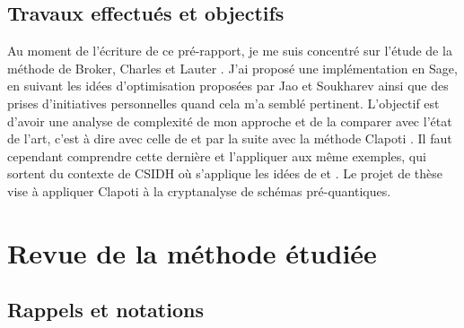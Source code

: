 \documentclass{article}
\theoremstyle{definition}
\theoremstyle{remark}
\begin{document}
	\subsection{Travaux effectués et objectifs}
	
	Au moment de l'écriture de ce pré-rapport, je me suis concentré sur l'étude de la méthode de Broker, Charles et Lauter \cite{BrokerCharlesLauter}. J'ai proposé une implémentation en Sage, en suivant les idées d'optimisation proposées par Jao et Soukharev \cite{JaoSoukharev} ainsi que des prises d'initiatives personnelles quand cela m'a semblé pertinent. L'objectif est d'avoir une analyse de complexité de mon approche et de la comparer avec l'état de l'art, c'est à dire avec celle de \cite{JaoSoukharev} et par la suite avec la méthode Clapoti \cite{Clapoti}. Il faut cependant comprendre cette dernière et l'appliquer aux même exemples, qui sortent du contexte de CSIDH où s'applique les idées de \cite{KLaPoTi} et \cite{Pegasis}. Le projet de thèse vise à appliquer Clapoti à la cryptanalyse de schémas pré-quantiques. 
	 
	\section{Revue de la méthode étudiée}
	
	\subsection{Rappels et notations}
	
\end{document}
